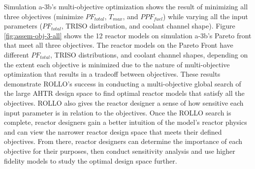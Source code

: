 Simulation a-3b's multi-objective optimization shows the result of minimizing all 
three objectives (minimize $PF_{total}$, $T_{max}$, and $PPF_{fuel}$) while varying 
all the input parameters ($PF_{total}$, TRISO distribution, and coolant channel shape).
Figure \ref{fig:assem-obj-3-all} shows the 12 reactor models on simulation 
a-3b's Pareto front that meet all three objectives. 
The reactor models on the Pareto Front have different $PF_{total}$, TRISO distributions, 
and coolant channel shapes, depending on the extent each objective is minimized due 
to the nature of multi-objective optimization that results in a tradeoff between 
objectives. 
These results demonstrate \gls{ROLLO}'s success in conducting a multi-objective global 
search of the large \gls{AHTR} design space to find optimal reactor models that satisfy 
all the objectives. 
\gls{ROLLO} also gives the reactor designer a sense of how sensitive 
each input parameter is in relation to the objectives. 
Once the \gls{ROLLO} search is complete, reactor designers gain a better intuition of 
the model's reactor physics and can view the narrower reactor design space that meets 
their defined objectives. 
From there, reactor designers can determine the importance of each objective for 
their purposes, then conduct sensitivity analysis and use higher fidelity models to 
study the optimal design space further.
